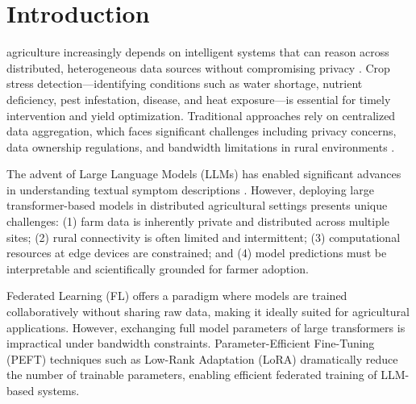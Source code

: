 \documentclass[10pt,journal,compsoc]{IEEEtran}
\begin{document}
\section{Introduction}
 agriculture increasingly depends on intelligent systems that can reason across distributed, heterogeneous data sources without compromising privacy \cite{kamilaris2018deep}. Crop stress detection---identifying conditions such as water shortage, nutrient deficiency, pest infestation, disease, and heat exposure---is essential for timely intervention and yield optimization. Traditional approaches rely on centralized data aggregation, which faces significant challenges including privacy concerns, data ownership regulations, and bandwidth limitations in rural environments \cite{durrant2022role}.

The advent of Large Language Models (LLMs) has enabled significant advances in understanding textual symptom descriptions \cite{devlin2018bert}. However, deploying large transformer-based models in distributed agricultural settings presents unique challenges: (1) farm data is inherently private and distributed across multiple sites; (2) rural connectivity is often limited and intermittent; (3) computational resources at edge devices are constrained; and (4) model predictions must be interpretable and scientifically grounded for farmer adoption.

Federated Learning (FL) \cite{mcmahan2017communication} offers a paradigm where models are trained collaboratively without sharing raw data, making it ideally suited for agricultural applications. However, exchanging full model parameters of large transformers is impractical under bandwidth constraints. Parameter-Efficient Fine-Tuning (PEFT) techniques such as Low-Rank Adaptation (LoRA) \cite{hu2022lora} dramatically reduce the number of trainable parameters, enabling efficient federated training of LLM-based systems.
\end{document}
